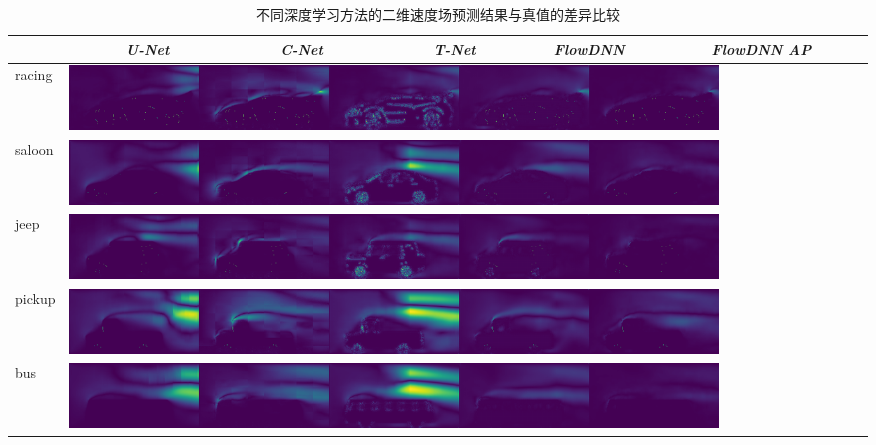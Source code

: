 \begin{table}[htp]
	\caption{不同深度学习方法的二维速度场预测结果与真值的差异比较}
	\label{tab:total_comp_case_error}
	\centering
	\begin{tabularx}{14cm}{p{0.8cm}p{2cm}p{2cm}p{2cm}p{2cm}p{2.4cm}}
		\toprule
		&  ~~~~~~~\textit{U-Net} & ~~~~~~~\textit{C-Net} & ~~~~~~~\textit{T-Net} & ~~~\textit{FlowDNN} & ~~~\textit{FlowDNN AP}   \\
		\midrule
		
		racing &\multicolumn{5}{l}{
			\begin{minipage}{\textwidth}
				\includegraphics[width=0.82\textwidth]{./figures/data/pic_xin_error/final_35.png}
			\end{minipage}}
		\\
		
		saloon &\multicolumn{5}{l}{
			\begin{minipage}{\textwidth}
				\includegraphics[width=0.82\textwidth]{./figures/data/pic_xin_error/final_32.png}
			\end{minipage}}
		\\
		jeep &\multicolumn{5}{l}{
			\begin{minipage}{\textwidth}
				\includegraphics[width=0.82\textwidth]{./figures/data/pic_xin_error/final_20.png}
			\end{minipage}}
		\\
		pickup &\multicolumn{5}{l}{
			\begin{minipage}{\textwidth}
				\includegraphics[width=0.82\textwidth]{./figures/data/pic_xin_error/final_39.png}
			\end{minipage}}
		\\	
		bus &\multicolumn{5}{l}{
			\begin{minipage}{\textwidth}
				\includegraphics[width=0.82\textwidth]{./figures/data/pic_xin_error/final_8.png}
			\end{minipage}}
		\\
		\bottomrule
	\end{tabularx}
\end{table}


